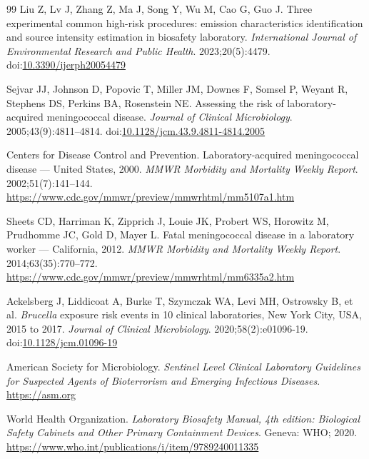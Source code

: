 \begin{thebibliography}{99}
Liu Z, Lv J, Zhang Z, Ma J, Song Y, Wu M, Cao G, Guo J. Three experimental
common high-risk procedures: emission characteristics identification and
source intensity estimation in biosafety laboratory. \textit{International
Journal of Environmental Research and Public Health}. 2023;20(5):4479.
doi:\href{https://doi.org/10.3390/ijerph20054479}{10.3390/ijerph20054479}

Sejvar JJ, Johnson D, Popovic T, Miller JM, Downes F, Somsel P, Weyant R,
Stephens DS, Perkins BA, Rosenstein NE. Assessing the risk of
laboratory-acquired meningococcal disease. \textit{Journal of Clinical
Microbiology}. 2005;43(9):4811--4814.
doi:\href{https://doi.org/10.1128/jcm.43.9.4811-4814.2005}{10.1128/jcm.43.9.4811-4814.2005}

Centers for Disease Control and Prevention. Laboratory-acquired meningococcal
disease --- United States, 2000. \textit{MMWR Morbidity and Mortality Weekly
Report}. 2002;51(7):141--144.
\url{https://www.cdc.gov/mmwr/preview/mmwrhtml/mm5107a1.htm}

Sheets CD, Harriman K, Zipprich J, Louie JK, Probert WS, Horowitz M,
Prudhomme JC, Gold D, Mayer L. Fatal meningococcal disease in a laboratory
worker --- California, 2012. \textit{MMWR Morbidity and Mortality Weekly
Report}. 2014;63(35):770--772.
\url{https://www.cdc.gov/mmwr/preview/mmwrhtml/mm6335a2.htm}

Ackelsberg J, Liddicoat A, Burke T, Szymczak WA, Levi MH, Ostrowsky B, et al.
\textit{Brucella} exposure risk events in 10 clinical laboratories, New York
City, USA, 2015 to 2017. \textit{Journal of Clinical Microbiology}.
2020;58(2):e01096-19.
doi:\href{https://doi.org/10.1128/jcm.01096-19}{10.1128/jcm.01096-19}

American Society for Microbiology. \textit{Sentinel Level Clinical Laboratory
Guidelines for Suspected Agents of Bioterrorism and Emerging Infectious
Diseases}. \url{https://asm.org}

World Health Organization. \textit{Laboratory Biosafety Manual, 4th edition:
Biological Safety Cabinets and Other Primary Containment Devices}. Geneva:
WHO; 2020. \url{https://www.who.int/publications/i/item/9789240011335}

\end{thebibliography}
